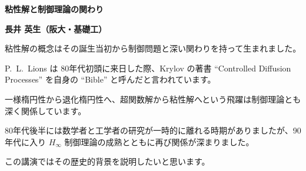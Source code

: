 \documentclass[uplatex,dvipdfmx]{jlreq}
\begin{document}
\newpage

\begin{center}
{\large\bfseries 粘性解と制御理論の関わり}
\end{center}

\begin{flushright}
\textbf{長井 英生（阪大・基礎工）}
\end{flushright}

粘性解の概念はその誕生当初から制御問題と深い関わりを持って生まれました。

P.~L.~Lions は 80年代初頭に来日した際、Krylov の著書
``Controlled Diffusion Processes'' を自身の ``Bible'' と呼んだと言われています。

一様楕円性から退化楕円性へ、超関数解から粘性解へという飛躍は制御理論とも深く関係しています。

80年代後半には数学者と工学者の研究が一時的に離れる時期がありましたが、90年代に入り $H_\infty$ 制御理論の成熟とともに再び関係が深まりました。

この講演ではその歴史的背景を説明したいと思います。
\end{document}
